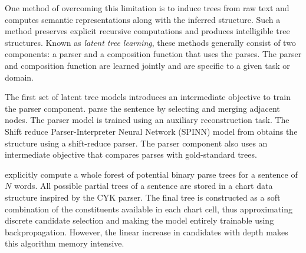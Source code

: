 One method of overcoming this limitation is to induce trees from raw text and computes semantic representations along with the inferred structure. Such a method preserves explicit recursive computations and produces intelligible tree structures. Known as \textit{latent tree learning}, these methods generally consist of two components: a parser and a composition function that uses the parses. The parser and composition function are learned jointly and are specific to a given task or domain. 


The first set of latent tree models introduces an intermediate objective to train the parser component. \textcite{socher_11c} parse the sentence by selecting and merging adjacent nodes. The parser model is trained using an auxiliary reconstruction task. The Shift reduce Parser-Interpreter Neural Network (SPINN) model from \textcite{bowman_16} obtains the structure using a shift-reduce parser. The parser component also uses an intermediate objective that compares parses with gold-standard trees.

\textcite{maillard_19} explicitly compute a whole forest of
potential binary parse trees for a sentence of $N$ words. 
All possible partial trees of a sentence are stored in a chart data structure inspired by the CYK parser. The final tree is constructed as a soft combination of the constituents available in each chart cell, thus approximating discrete candidate selection and making the model entirely trainable using backpropagation. However, the linear increase in candidates with depth makes this algorithm memory intensive.



